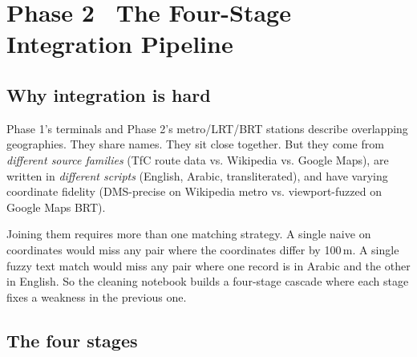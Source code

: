 
\section{Phase 2 \textbullet\ The Four-Stage Integration Pipeline}
\label{sec:phase2-integration}

\subsection{Why integration is hard}

Phase 1's terminals and Phase 2's metro/LRT/BRT stations describe
overlapping geographies. They share names. They sit close together.
But they come from \emph{different source families} (TfC route data
vs. Wikipedia vs. Google Maps), are written in \emph{different
scripts} (English, Arabic, transliterated), and have varying
coordinate fidelity (DMS-precise on Wikipedia metro vs.
viewport-fuzzed on Google Maps BRT).

Joining them requires more than one matching strategy. A single naive
 on coordinates would miss any pair where the coordinates
differ by 100\,m. A single fuzzy text match would miss any pair where
one record is in Arabic and the other in English. So the cleaning
notebook builds a four-stage cascade where each stage fixes a
weakness in the previous one.

\subsection{The four stages}

